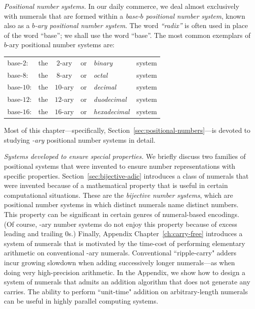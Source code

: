  
\noindent
{\it Positional number systems.}
In our daily commerce, we deal almost exclusively with numerals that are formed within a {\it base-$b$ positional number system},  known also as a {\it $b$-ary positional number system}.
The word {\it ``radix''} is often used in place of the word ``base''; we shall use the word ``base''.  The most common exemplars of $b$-ary positional number systems are:

\smallskip

\begin{tabular}{llclll}
base-$2$:  & the & $2$-ary  & or & {\em binary}      & system \\
base-$8$:  & the & $8$-ary  & or & {\em octal}       & system \\
base-$10$: & the & $10$-ary & or & {\em decimal}     & system \\
base-$12$: & the & $12$-ary & or & {\em duodecimal}  & system \\
base-$16$: & the & $16$-ary & or & {\em hexadecimal} & system
\end{tabular}

\smallskip

\noindent
Most of this chapter---specifically,
Section~\ref{sec:positional-numbers}---is devoted to studying {\em
  -ary} positional number systems in detail.

\medskip


\noindent
{\it Systems developed to ensure special properties.}
We briefly discuss two families of positional systems that were invented to ensure number representations with specific properties.  Section~\ref{sec:bijective-adic} introduces a class of numerals that were invented because of a mathematical property that is useful in certain computational situations.  These are the {\em bijective number systems},  which are positional number systems in which distinct numerals name distinct numbers.  This property can be significant in certain genres of numeral-based encodings.  (Of course, -ary number systems do not enjoy this property because of excess leading and trailing $0$s.)  Finally, Appendix Chapter~\ref{ch:carry-free} introduces a system of numerals that is motivated by the time-cost of performing elementary arithmetic on conventional -ary numerals.  Conventional ``ripple-carry" adders incur growing slowdown when adding successively longer numerals---as when doing very high-precision arithmetic.  In the Appendix, we show how to design a system of numerals that admits an addition algorithm that does not generate any carries.  The ability to perform ``unit-time" addition on arbitrary-length numerals can be useful in highly parallel computing systems.

